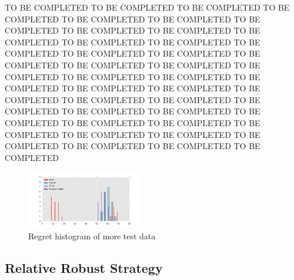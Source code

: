 \documentclass[14pt]{article}
\begin{document}
    TO BE COMPLETED TO BE COMPLETED TO BE COMPLETED TO BE COMPLETED TO BE COMPLETED TO BE COMPLETED TO BE COMPLETED TO BE COMPLETED TO BE COMPLETED TO BE COMPLETED TO BE COMPLETED TO BE COMPLETED TO BE COMPLETED TO BE COMPLETED TO BE COMPLETED TO BE COMPLETED TO BE COMPLETED TO BE COMPLETED TO BE COMPLETED TO BE COMPLETED TO BE COMPLETED TO BE COMPLETED TO BE COMPLETED TO BE COMPLETED TO BE COMPLETED TO BE COMPLETED TO BE COMPLETED TO BE COMPLETED TO BE COMPLETED TO BE COMPLETED TO BE COMPLETED TO BE COMPLETED TO BE COMPLETED TO BE COMPLETED TO BE COMPLETED TO BE COMPLETED TO BE COMPLETED TO BE COMPLETED TO BE COMPLETED TO BE COMPLETED 


    \begin{figure}
       \centering
       \includegraphics[width=0.45\textwidth]{regret.png}
        \caption{Regret histogram of more test data}
        \label{fig:regret}
    \end{figure}

\subsection{Relative Robust Strategy}
\end{document}
